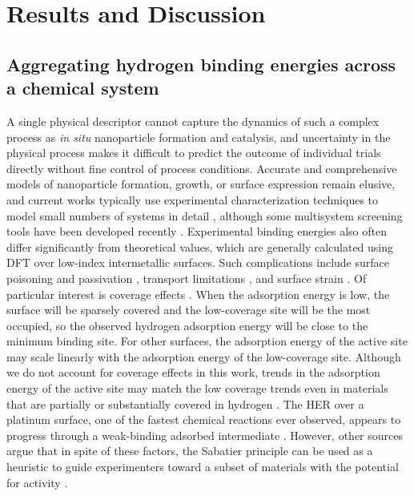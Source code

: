 \documentclass[preprint,12pt]{elsarticle}
\begin{document}
\section{Results and Discussion}\label{Section:Results}
\subsection{Aggregating hydrogen binding energies across a chemical system}
A single physical descriptor cannot capture the dynamics of such a complex process as {\it in situ} nanoparticle formation and catalysis, and uncertainty in the physical process makes it difficult to predict the outcome of individual trials directly without fine control of process conditions. Accurate and comprehensive models of nanoparticle formation, growth, or surface expression remain elusive, and current works typically use experimental characterization techniques to model small numbers of systems in detail \cite{chen2019kinetics,ma2019toward,gamler2019achieving}, although some multisystem screening tools have been developed recently \cite{wahl2021machine,li2019intermetallic,palizhati2019toward}. Experimental binding energies also often differ significantly from theoretical values, which are generally calculated using DFT over low-index intermetallic surfaces. Such complications include surface poisoning and passivation \cite{quaino2014volcano}, transport limitations \cite{rheinlander2013comparing}, and surface strain \cite{khorshidi2018strain}. Of particular interest is coverage effects \cite{frey2014implications}. When the adsorption energy is low, the surface will be sparsely covered and the low-coverage site will be the most occupied, so the observed hydrogen adsorption energy will be close to the minimum binding site. For other surfaces, the adsorption energy of the active site may scale linearly with the adsorption energy of the low-coverage site. Although we do not account for coverage effects in this work, trends in the adsorption energy of the active site may match the low coverage trends even in materials that are partially or substantially covered in hydrogen \cite{lausche2013effect}. The HER over a platinum surface, one of the fastest chemical reactions ever observed, appears to progress through a weak-binding adsorbed intermediate \cite{lindgren2019challenge,ooka2021non}. However, other sources argue that in spite of these factors, the Sabatier principle can be used as a heuristic to guide experimenters toward a subset of materials with the potential for activity \cite{ulissi2011effect,schipper2018effects}. 
\end{document}
